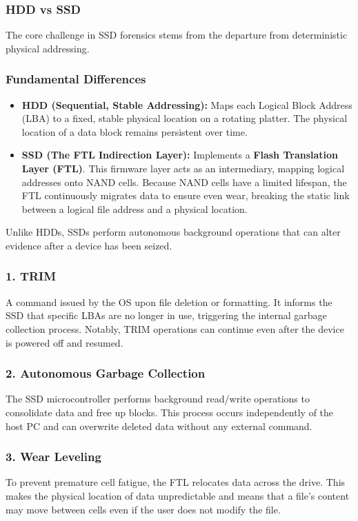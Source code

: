 \subsubsection{HDD vs SSD}

The core challenge in SSD forensics stems from the departure from deterministic physical addressing. 

\subsubsection*{Fundamental Differences}
\begin{itemize}
    \item \textbf{HDD (Sequential, Stable Addressing):} Maps each Logical Block Address (LBA) to a fixed, stable physical location on a rotating platter. The physical location of a data block remains persistent over time.
    \item \textbf{SSD (The FTL Indirection Layer):} Implements a \textbf{Flash Translation Layer (FTL)}. This firmware layer acts as an intermediary, mapping logical addresses onto NAND cells. Because NAND cells have a limited lifespan, the FTL continuously migrates data to ensure even wear, breaking the static link between a logical file address and a physical location.
\end{itemize}

\noindent
Unlike HDDs, SSDs perform autonomous background operations that can alter evidence after a device has been seized.

\subsubsection*{1. TRIM}
A command issued by the OS upon file deletion or formatting. It informs the SSD that specific LBAs are no longer in use, triggering the internal garbage collection process. Notably, TRIM operations can continue even after the device is powered off and resumed.

\subsubsection*{2. Autonomous Garbage Collection}
The SSD microcontroller performs background read/write operations to consolidate data and free up blocks. This process occurs independently of the host PC and can overwrite deleted data without any external command.

\subsubsection*{3. Wear Leveling}
To prevent premature cell fatigue, the FTL relocates data across the drive. This makes the physical location of data unpredictable and means that a file's content may move between cells even if the user does not modify the file.


